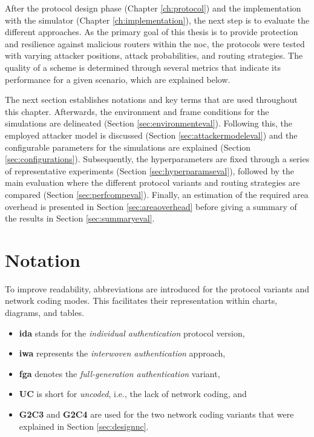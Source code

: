 After the protocol design phase (Chapter \ref{ch:protocol}) and the implementation with the simulator (Chapter \ref{ch:implementation}), the next step
is to evaluate the different approaches. As the primary goal of this thesis is to provide protection and resilience against malicious routers within
the \gls{noc}, the protocols were tested with varying attacker positions, attack probabilities, and routing strategies. The quality of a scheme
is determined through several metrics that indicate its performance for a given scenario, which are explained below.

The next section establishes notations and key terms that are used throughout this chapter. Afterwards, the environment and frame conditions for the
simulations are delineated (Section \ref{sec:environmenteval}). Following this, the employed attacker model is discussed (Section
\ref{sec:attackermodeleval}) and the configurable parameters for the simulations are explained (Section \ref{sec:configurations}). Subsequently,
the hyperparameters are fixed through a series of representative experiments (Section
\ref{sec:hyperparamseval}), followed by the main evaluation where the different protocol variants and routing strategies are compared (Section
\ref{sec:perfcompeval}). Finally, an estimation of the required area overhead is presented in Section \ref{sec:areaoverhead} before giving a summary
of the results in Section \ref{sec:summaryeval}.

\section{Notation}\label{sec:notationeval}
To improve readability, abbreviations are introduced for the protocol variants and network coding modes. This facilitates their representation within
charts, diagrams, and tables.
\begin{itemize}
    \item \textbf{\Gls{ida}} stands for the \textit{individual authentication} protocol version,
    \item \textbf{\Gls{iwa}} represents the \textit{interwoven authentication} approach,
    \item \textbf{\Gls{fga}} denotes the \textit{full-generation authentication} variant,
    \item \textbf{UC} is short for \textit{uncoded}, i.e., the lack of network coding, and
    \item \textbf{G2C3} and \textbf{G2C4} are used for the two network coding variants that were explained in Section \ref{sec:designnc}.
\end{itemize}

